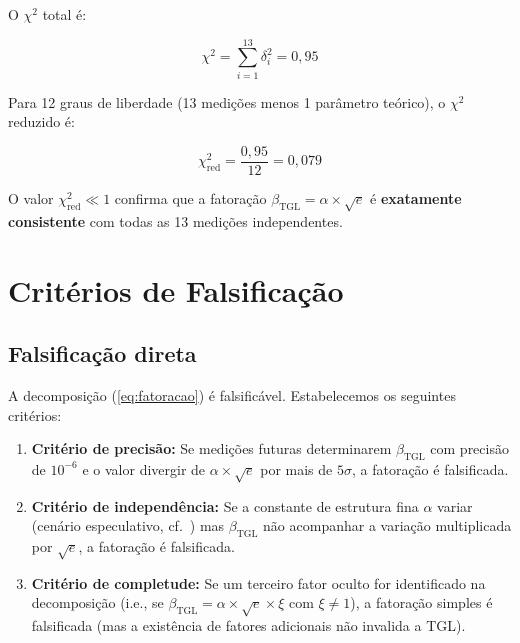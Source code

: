\documentclass[12pt,a4paper,twoside]{article}
\newcommand{\betatgl}{\beta_{\!\scriptscriptstyle\mathrm{TGL}}}
\begin{document}
O $\chi^2$ total é:

\begin{equation}
\chi^2 = \sum_{i=1}^{13} \delta_i^2 = 0{,}95
\end{equation}

Para 12 graus de liberdade (13 medições menos 1 parâmetro teórico), o $\chi^2$ reduzido é:

\begin{equation}
\chi^2_{\text{red}} = \frac{0{,}95}{12} = 0{,}079
\end{equation}

O valor $\chi^2_{\text{red}} \ll 1$ confirma que a fatoração $\betatgl = \alpha \times \sqrt{e}$ é \textbf{exatamente consistente} com todas as 13 medições independentes.



\section{Critérios de Falsificação}
\label{sec:falsificacao}

\subsection{Falsificação direta}

A decomposição (\ref{eq:fatoracao}) é falsificável. Estabelecemos os seguintes critérios:

\begin{enumerate}[label=(\roman*)]
\item \textbf{Critério de precisão:} Se medições futuras determinarem $\betatgl$ com precisão de $10^{-6}$ e o valor divergir de $\alpha \times \sqrt{e}$ por mais de $5\sigma$, a fatoração é falsificada.

\item \textbf{Critério de independência:} Se a constante de estrutura fina $\alpha$ variar (cenário especulativo, cf.\ \cite{Webb2001}) mas $\betatgl$ não acompanhar a variação multiplicada por $\sqrt{e}$, a fatoração é falsificada.

\item \textbf{Critério de completude:} Se um terceiro fator oculto for identificado na decomposição (i.e., se $\betatgl = \alpha \times \sqrt{e} \times \xi$ com $\xi \neq 1$), a fatoração simples é falsificada (mas a existência de fatores adicionais não invalida a TGL).
\end{enumerate}
\end{document}
